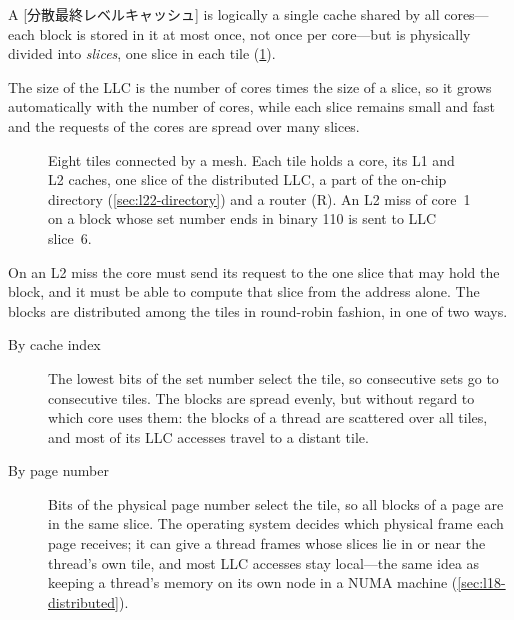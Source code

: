 \documentclass[../main.tex]{subfiles}
\begin{document}
\begin{definition}
  A [分散最終レベルキャッシュ] is
  logically a single cache shared by all cores---each block is stored in it
  at most once, not once per core---but is physically divided into
  \emph{slices}, one slice in each tile (\cref{fig:l22-llc}).
\end{definition}

The size of the LLC is the number of cores times the size of a slice, so it
grows automatically with the number of cores, while each slice remains
small and fast and the requests of the cores are spread over many
slices.

\begin{figure}[htbp]
  \centering
  
  \caption{Eight tiles connected by a mesh.  Each tile holds a core, its L1
    and L2 caches, one slice of the distributed LLC, a part of the on-chip
    directory (\cref{sec:l22-directory}) and a router (R).  An L2 miss of
    core~1 on a block whose set number ends in binary 110 is sent to LLC
    slice~6.}
  \label{fig:l22-llc}
\end{figure}

On an L2 miss the core must send its request to the one slice that may hold
the block, and it must be able to compute that slice from the address alone.
The blocks are distributed among the tiles in round-robin fashion, in one
of two ways.
\begin{description}
  \item[By cache index] The lowest bits of the set number select the tile, so
    consecutive sets go to consecutive tiles.  The blocks are spread evenly,
    but without regard to which core uses them: the blocks of a thread are
    scattered over all tiles, and most of its LLC accesses travel to a
    distant tile.
  \item[By page number] Bits of the physical page number select the tile, so
    all blocks of a page are in the same slice.  The operating system
    decides which physical frame each page receives; it can give a thread
    frames whose slices lie in or near the thread's own tile, and most LLC
    accesses stay local---the same idea as keeping a thread's memory on its
    own node in a NUMA machine (\cref{sec:l18-distributed}).
\end{description}
\end{document}
